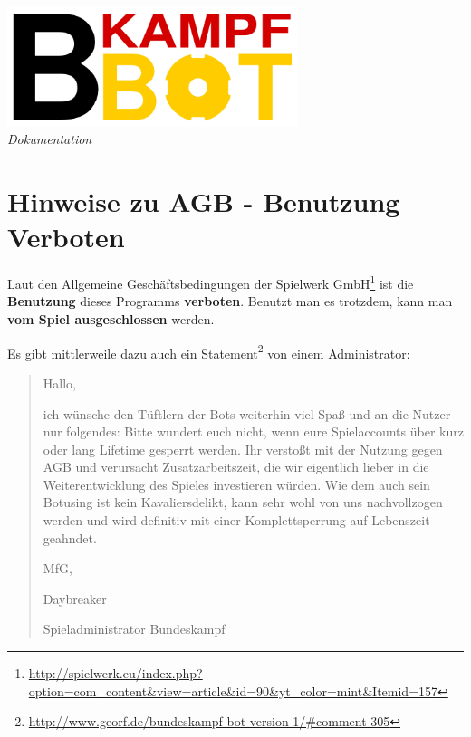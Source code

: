 \documentclass{scrartcl}
\begin{document}
\begin{titlepage}
\begin{center}
\includegraphics[width=85mm]{bkampfbotlogo.png}
\\ \Large \sl {Dokumentation} \\

\vspace{25pt}
\end{center}

\tableofcontents

\end{titlepage}

\setlength{\parskip}{5pt}

\section{Hinweise zu AGB - Benutzung Verboten}
\label{verboten}
Laut den Allgemeine Geschäftsbedingungen der Spielwerk GmbH\footnote{\url{http://spielwerk.eu/index.php?option=com_content&view=article&id=90&yt_color=mint&Itemid=157}} ist die \textbf{Benutzung} dieses Programms \textbf{verboten}. Benutzt man es trotzdem, kann man \textbf{vom Spiel ausgeschlossen} werden.

Es gibt mittlerweile dazu auch ein Statement\footnote{\url{http://www.georf.de/bundeskampf-bot-version-1/\#comment-305}} von einem Administrator:

\begin{shaded}
\begin{quote}
Hallo,

    ich wünsche den Tüftlern der Bots weiterhin viel Spaß und an die Nutzer nur folgendes: Bitte wundert euch nicht, wenn eure Spielaccounts über kurz oder lang Lifetime gesperrt werden. Ihr verstoßt mit der Nutzung gegen AGB und verursacht Zusatzarbeitszeit, die wir eigentlich lieber in die Weiterentwicklung des Spieles investieren würden. Wie dem auch sein Botusing ist kein Kavaliersdelikt, kann sehr wohl von uns nachvollzogen werden und wird definitiv mit einer Komplettsperrung auf Lebenszeit geahndet.

    MfG,

    Daybreaker

    Spieladministrator Bundeskampf

\end{quote}
\end{shaded}
\end{document}
